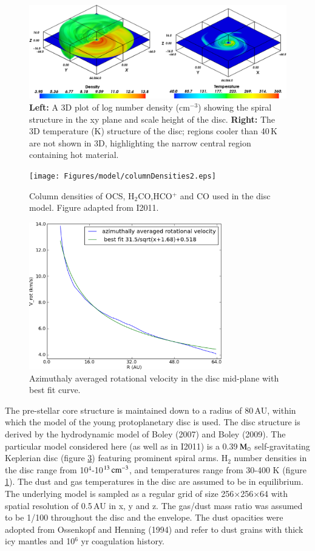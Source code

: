 \documentclass[useAMS,usenatbib]{mn2e}
\begin{document}
\begin{figure}
 \includegraphics[width=168mm]{Figures/model/rhoT6.eps}
 \caption{{\bf Left:} A 3D plot of log number density (cm$^{-3}$) showing the spiral structure in the xy plane and scale height of the disc. {\bf Right:} The 3D temperature (K) structure of the disc; regions cooler than 40$\,$K are not shown in 3D, highlighting the narrow central region containing hot material.}
 \label{rhoT} 
\end{figure}

\begin{figure}
 \texttt{[image: Figures/model/columnDensities2.eps]}
 \caption{Column densities of OCS, H$_2$CO,HCO$^+$ and CO used in the disc model. Figure adapted from I2011.}
 \label{Chemistry} 
\end{figure}

\begin{figure}
 \includegraphics[width=84mm]{Figures/model/rotational_velocities.eps}
 \caption{Azimuthaly averaged rotational velocity in the disc mid-plane with best fit curve.}
 \label{velocity}
\end{figure}


The pre-stellar core structure is maintained down to a radius of 80\,AU, within which the model of the young protoplanetary disc is used. The disc structure is derived by the hydrodynamic model of Boley (2007) and Boley (2009). The particular model considered here (as well as in I2011) is a 0.39$\,\rm{M}_\odot$ self-gravitating Keplerian disc (figure \ref{velocity}) featuring prominent spiral arms. H$_2$ number densities in the disc range from 10$^{4}$-10$^{13}\,\rm{cm}^{-3}$, and temperatures range from 30-400 K (figure \ref{rhoT}). The dust and gas temperatures in the disc are assumed to be in equilibrium. The underlying model is sampled as a regular grid of size 256$\times$256$\times$64 with spatial resolution of 0.5$\,$AU in x, y and z. The gas/dust mass ratio was assumed to be 1/100 throughout the disc and the envelope. The dust opacities were adopted from Ossenkopf and Henning (1994) and refer to dust grains with thick icy mantles and 10$^6$ yr coagulation history.\newline
\end{document}
